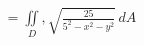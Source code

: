 \documentclass[preview]{standalone}
\begin{document}
\begin{align*}
= \iint\limits_D, \sqrt{\frac{25}{5^2-x^2-y^2}}\, dA
\end{align*}
\end{document}
